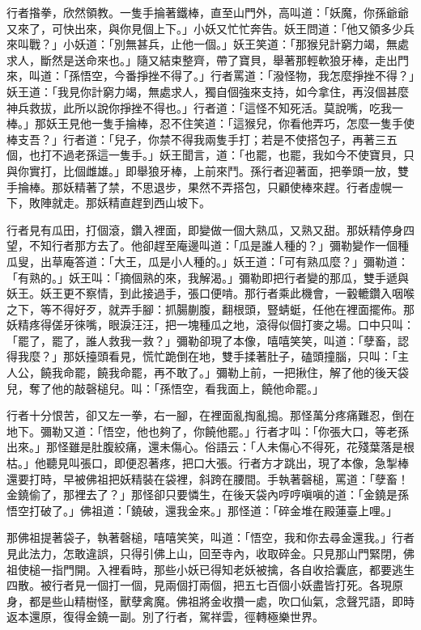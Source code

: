 行者揝拳，欣然領教。一隻手掄著鐵棒，直至山門外，高叫道：「妖魔，你孫爺爺又來了，可快出來，與你見個上下。」小妖又忙忙奔告。妖王問道：「他又領多少兵來叫戰？」小妖道：「別無甚兵，止他一個。」妖王笑道：「那猴兒計窮力竭，無處求人，斷然是送命來也。」隨又結束整齊，帶了寶貝，舉著那輕軟狼牙棒，走出門來，叫道：「孫悟空，今番掙挫不得了。」行者罵道：「潑怪物，我怎麼掙挫不得？」妖王道：「我見你計窮力竭，無處求人，獨自個強來支持，如今拿住，再沒個甚麼神兵救拔，此所以說你掙挫不得也。」行者道：「這怪不知死活。莫說嘴，吃我一棒。」那妖王見他一隻手掄棒，忍不住笑道：「這猴兒，你看他弄巧，怎麼一隻手使棒支吾？」行者道：「兒子，你禁不得我兩隻手打；若是不使搭包子，再著三五個，也打不過老孫這一隻手。」妖王聞言，道：「也罷，也罷，我如今不使寶貝，只與你實打，比個雌雄。」即舉狼牙棒，上前來鬥。孫行者迎著面，把拳頭一放，雙手掄棒。那妖精著了禁，不思退步，果然不弄搭包，只顧使棒來趕。行者虛幌一下，敗陣就走。那妖精直趕到西山坡下。

行者見有瓜田，打個滾，鑽入裡面，即變做一個大熟瓜，又熟又甜。那妖精停身四望，不知行者那方去了。他卻趕至庵邊叫道：「瓜是誰人種的？」彌勒變作一個種瓜叟，出草庵答道：「大王，瓜是小人種的。」妖王道：「可有熟瓜麼？」彌勒道：「有熟的。」妖王叫：「摘個熟的來，我解渴。」彌勒即把行者變的那瓜，雙手遞與妖王。妖王更不察情，到此接過手，張口便啃。那行者乘此機會，一轂轆鑽入咽喉之下，等不得好歹，就弄手腳：抓腸蒯腹，翻根頭，豎蜻蜓，任他在裡面擺佈。那妖精疼得傞牙徠嘴，眼淚汪汪，把一塊種瓜之地，滾得似個打麥之場。口中只叫：「罷了，罷了，誰人救我一救？」彌勒卻現了本像，嘻嘻笑笑，叫道：「孽畜，認得我麼？」那妖擡頭看見，慌忙跪倒在地，雙手揉著肚子，磕頭撞腦，只叫：「主人公，饒我命罷，饒我命罷，再不敢了。」彌勒上前，一把揪住，解了他的後天袋兒，奪了他的敲磬槌兒。叫：「孫悟空，看我面上，饒他命罷。」

行者十分恨苦，卻又左一拳，右一腳，在裡面亂掏亂搗。那怪萬分疼痛難忍，倒在地下。彌勒又道：「悟空，他也夠了，你饒他罷。」行者才叫：「你張大口，等老孫出來。」那怪雖是肚腹絞痛，還未傷心。俗語云：「人未傷心不得死，花殘葉落是根枯。」他聽見叫張口，即便忍著疼，把口大張。行者方才跳出，現了本像，急掣棒還要打時，早被佛祖把妖精裝在袋裡，斜跨在腰間。手執著磬槌，罵道：「孽畜！金鐃偷了，那裡去了？」那怪卻只要憐生，在後天袋內哼哼嗔嗔的道：「金鐃是孫悟空打破了。」佛祖道：「鐃破，還我金來。」那怪道：「碎金堆在殿蓮臺上哩。」

那佛祖提著袋子，執著磬槌，嘻嘻笑笑，叫道：「悟空，我和你去尋金還我。」行者見此法力，怎敢違誤，只得引佛上山，回至寺內，收取碎金。只見那山門緊閉，佛祖使槌一指門開。入裡看時，那些小妖已得知老妖被擒，各自收拾囊底，都要逃生四散。被行者見一個打一個，見兩個打兩個，把五七百個小妖盡皆打死。各現原身，都是些山精樹怪，獸孽禽魔。佛祖將金收攢一處，吹口仙氣，念聲咒語，即時返本還原，復得金鐃一副。別了行者，駕祥雲，徑轉極樂世界。

